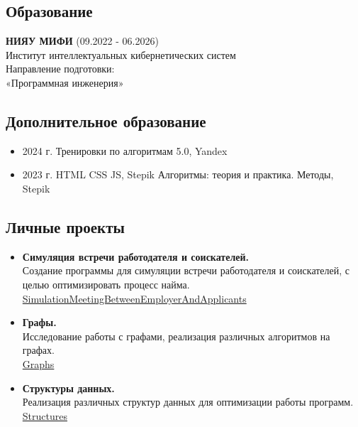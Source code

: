 \documentclass[14pt]{extarticle}
\begin{document}
\begin{minipage}{0.6\textwidth} %
      \subsection*{Образование}
      \textbf{НИЯУ МИФИ} (09.2022 - 06.2026) \\
      Институт интеллектуальных кибернетических систем \\
      Направление подготовки:\\ «Программная инженерия»

      \subsection*{Дополнительное образование}
      \begin{itemize}
            \item 2024 г.
                  \subitem Тренировки по алгоритмам 5.0, Yandex
            \item 2023 г.
                  \subitem HTML CSS JS, Stepik
                  \subitem Алгоритмы: теория и практика. Методы, Stepik
      \end{itemize}
      \subsection*{Личные проекты}
      \begin{itemize}
            \item \textbf{Симуляция встречи работодателя и соискателей.} \\
                  Создание программы для симуляции встречи работодателя и соискателей, с целью оптимизировать процесс найма. \\
                  \href{https://github.com/MichaelKolesnikov/SimulationMeetingBetweenEmployerAndApplicants}{SimulationMeetingBetweenEmployerAndApplicants}

            \item \textbf{Графы.} \\
                  Исследование работы с графами, реализация различных алгоритмов на графах. \\
                  \href{https://github.com/MichaelKolesnikov/Graphs}{Graphs}

            \item \textbf{Структуры данных.} \\
                  Реализация различных структур данных для оптимизации работы программ. \\
                  \href{https://github.com/MichaelKolesnikov/Structures}{Structures}


\end{itemize}
\end{minipage}
\end{document}
